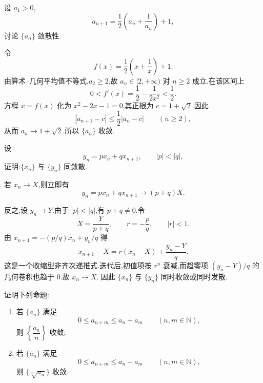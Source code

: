 \begin{example}
  设 $a_1>0$,
  \[
    a_{n+1}=\dfrac{1}{2}\left(a_n+\dfrac{1}{a_n}\right)+1,
  \]
  讨论 $\{a_n\}$ 敛散性.
\end{example}
\exampleblank

\begin{solution}
  令
  \[
    f(x)=\dfrac{1}{2}\left(x+\dfrac{1}{x}\right)+1.
  \]
  由算术--几何平均值不等式,$a_2\geq2$,故 $a_n\in\lbrack2,+\infty)$ 对
  $n\geq2$ 成立.在该区间上
  \[
    0<f'(x)=\dfrac{1}{2}-\dfrac{1}{2x^2}<\dfrac{1}{2}.
  \]
  方程 $x=f(x)$ 化为 $x^2-2x-1=0$,其正根为
  $c=1+\sqrt2$.因此
  \[
    |a_{n+1}-c|\leq\dfrac{1}{2}|a_n-c|
    \qquad(n\geq2),
  \]
  从而 $a_n\to1+\sqrt2$.所以 $\{a_n\}$ 收敛.
\end{solution}

\begin{example}
  设
  \[
    y_n=px_n+qx_{n+1},
    \qquad |p|<|q|,
  \]
  证明:$\{x_n\}$ 与 $\{y_n\}$ 同敛散.
\end{example}
\exampleblank

\begin{solution}
  若 $x_n\to X$,则立即有
  \[
    y_n=px_n+qx_{n+1}\longrightarrow(p+q)X.
  \]

  反之,设 $y_n\to Y$.由于 $|p|<|q|$,有 $p+q\neq0$.令
  \[
    X=\dfrac{Y}{p+q},
    \qquad r=-\dfrac{p}{q},
    \qquad |r|<1.
  \]
  由 $x_{n+1}=-(p/q)x_n+y_n/q$ 得
  \[
    x_{n+1}-X=r(x_n-X)+\dfrac{y_n-Y}{q}.
  \]
  这是一个收缩型非齐次递推式.迭代后,初值项按 $r^n$ 衰减,而趋零项
  $(y_n-Y)/q$ 的几何卷积也趋于 $0$.故 $x_n\to X$.
  因此 $\{x_n\}$ 与 $\{y_n\}$ 同时收敛或同时发散.
\end{solution}

\begin{example}
  证明下列命题:
  \begin{enumerate}
    \item 若 $\{a_n\}$ 满足
          \[
            0\leq a_{n+m}\leq a_n+a_m\qquad(n,m\in\mathbb N),
          \]
          则 $\left\{\dfrac{a_n}{n}\right\}$ 收敛;
    \item 若 $\{a_n\}$ 满足
          \[
            0\leq a_{n+m}\leq a_n-a_m\qquad(n,m\in\mathbb N),
          \]
          则 $\{\sqrt[n]{a_n}\}$ 收敛.
  \end{enumerate}
\end{example}
\exampleblank

